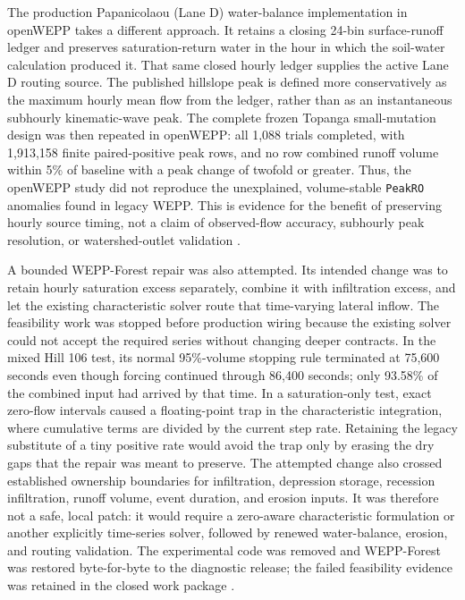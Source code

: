 \documentclass[11pt]{article}
\newcommand{\PeakRO}{\texttt{PeakRO}}
\begin{document}
The production Papanicolaou (Lane D) water-balance implementation in
openWEPP takes a different approach. It retains a closing 24-bin surface-runoff
ledger and preserves saturation-return water in the hour in which the soil-water
calculation produced it. That same closed hourly ledger supplies the active
Lane D routing source. The published hillslope peak is defined more
conservatively as the maximum hourly mean flow from the ledger, rather than as
an instantaneous subhourly kinematic-wave peak. The complete frozen Topanga
small-mutation design was then repeated in openWEPP: all 1,088 trials completed,
with 1,913,158 finite paired-positive peak rows, and no row combined runoff
volume within 5\% of baseline with a peak change of twofold or greater. Thus,
the openWEPP study did not reproduce the unexplained, volume-stable \PeakRO{}
anomalies found in legacy WEPP. This is evidence for the benefit of preserving
hourly source timing, not a claim of observed-flow accuracy, subhourly peak
resolution, or watershed-outlet validation \cite{openweppclosure}.

A bounded WEPP-Forest repair was also attempted. Its intended change was to
retain hourly saturation excess separately, combine it with infiltration excess,
and let the existing characteristic solver route that time-varying lateral
inflow. The feasibility work was stopped before production wiring because the
existing solver could not accept the required series without changing deeper
contracts. In the mixed Hill 106 test, its normal 95\%-volume stopping rule
terminated at 75,600 seconds even though forcing continued through 86,400
seconds; only 93.58\% of the combined input had arrived by that time. In a
saturation-only test, exact zero-flow intervals caused a floating-point trap in
the characteristic integration, where cumulative terms are divided by the
current step rate. Retaining the legacy substitute of a tiny positive rate
would avoid the trap only by erasing the dry gaps that the repair was meant to
preserve. The attempted change also crossed established ownership boundaries
for infiltration, depression storage, recession infiltration, runoff volume,
event duration, and erosion inputs. It was therefore not a safe, local patch:
it would require a zero-aware characteristic formulation or another explicitly
time-series solver, followed by renewed water-balance, erosion, and routing
validation. The experimental code was removed and WEPP-Forest was restored
byte-for-byte to the diagnostic release; the failed feasibility evidence was
retained in the closed work package \cite{forestpf01}.
\end{document}
